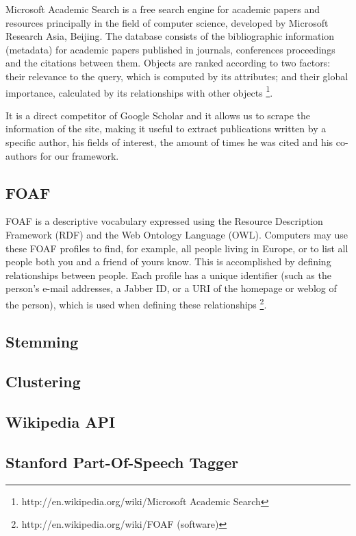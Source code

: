 Microsoft Academic Search is a free search engine for academic papers and resources principally in the field of computer science, developed by Microsoft Research Asia, Beijing. The database consists of the bibliographic information (metadata) for academic papers published in journals, conferences proceedings and the citations between them. Objects are ranked according to two factors: their relevance to the query, which is computed by its attributes; and their global importance, calculated by its relationships with other objects \footnote{http://en.wikipedia.org/wiki/Microsoft Academic Search}.

It is a direct competitor of Google Scholar and it allows us to scrape the information of the site, making it useful to extract publications written by a specific author, his fields of interest, the amount of times he was cited and his co-authors for our framework.

\subsection{FOAF}

FOAF is a descriptive vocabulary expressed using the Resource Description Framework (RDF) and the Web Ontology Language (OWL). Computers may use these FOAF profiles to find, for example, all people living in Europe, or to list all people both you and a friend of yours know. This is accomplished by defining relationships between people. Each profile has a unique identifier (such as the person's e-mail addresses, a Jabber ID, or a URI of the homepage or weblog of the person), which is used when defining these relationships \footnote{http://en.wikipedia.org/wiki/FOAF (software)}.


\subsection{Stemming}

\subsection{Clustering}

\subsection{Wikipedia API}

\subsection{Stanford Part-Of-Speech Tagger}

